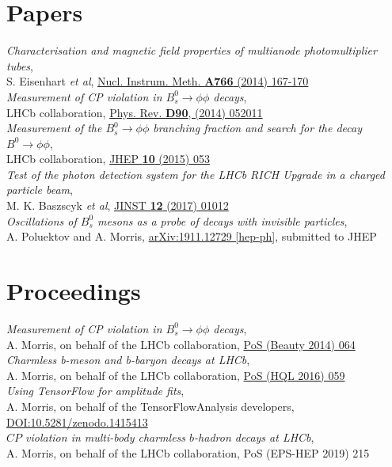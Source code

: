 \documentclass[contbibnum,titleabove]{simplecv}
\begin{document}
	\section{Papers}
	\vspace{0.5em}
		\textit{Characterisation and magnetic field properties of multianode photomultiplier tubes},\\ S. Eisenhart \textit{et al}, \href{http://dx.doi.org/10.1016/j.nima.2014.05.036}{Nucl. Instrum. Meth. \textbf{A766} (2014) 167-170}\\[1ex]
		\textit{Measurement of CP violation in $B^0_s \to \phi\phi$ decays},\\ LHCb collaboration, \href{http://dx.doi.org/10.1103/PhysRevD.90.052011}{Phys. Rev. \textbf{D90}, (2014) 052011}\\[1ex]
		\textit{Measurement of the $B^0_s \to \phi\phi$ branching fraction and search for the decay $B^0 \to \phi \phi$},\\ LHCb collaboration, \href{http://dx.doi.org/10.1007/JHEP10(2015)053}{JHEP \textbf{10} (2015) 053}\\[1ex]
		\textit{Test of the photon detection system for the LHCb RICH Upgrade in a charged particle beam},\\ M. K. Baszscyk \textit{et al}, \href{http://cds.cern.ch/record/2197586}{JINST \textbf{12} (2017) 01012}\\[1ex]
		\textit{Oscillations of $B_s^0$ mesons as a probe of decays with invisible particles},\\ A. Poluektov and A. Morris, \href{https://arxiv.org/abs/1911.12729}{arXiv:1911.12729 [hep-ph]}, submitted to JHEP
	\section{Proceedings}
	\vspace{0.5em}
		\textit{Measurement of CP violation in $B^0_s \to \phi\phi$ decays},\\ A. Morris, on behalf of the LHCb collaboration, \href{https://pos.sissa.it/cgi-bin/reader/contribution.cgi?id=216/064}{PoS (Beauty 2014) 064}\\[1ex]
		\textit{Charmless b-meson and b-baryon decays at LHCb},\\ A. Morris, on behalf of the LHCb collaboration, \href{https://pos.sissa.it/cgi-bin/reader/contribution.cgi?id=274/059}{PoS (HQL 2016) 059}\\[1ex]
		\textit{Using TensorFlow for amplitude fits},\\ A. Morris, on behalf of the TensorFlowAnalysis developers, \href{https://doi.org/10.5281/zenodo.1415413}{DOI:10.5281/zenodo.1415413}\\[1ex]
		\textit{$C\!P$ violation in multi-body charmless $b$-hadron decays at LHCb},\\ A. Morris, on behalf of the LHCb collaboration, PoS (EPS-HEP 2019) 215\\[1ex]
\end{document}
